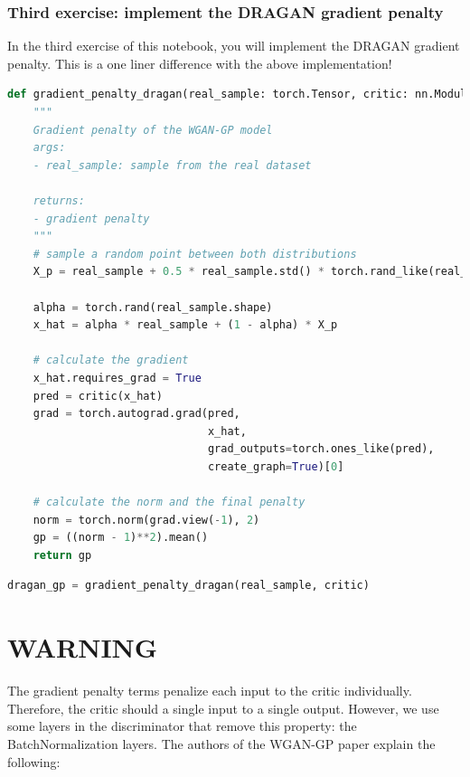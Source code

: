 \subsubsection{Third exercise: implement the DRAGAN gradient penalty}

In the third exercise of this notebook, you will implement the DRAGAN
gradient penalty. This is a one liner difference with the above
implementation!

\begin{lstlisting}[language=Python]
def gradient_penalty_dragan(real_sample: torch.Tensor, critic: nn.Module) -> torch.Tensor:
    """
    Gradient penalty of the WGAN-GP model
    args:
    - real_sample: sample from the real dataset
    
    returns:
    - gradient penalty
    """
    # sample a random point between both distributions
    X_p = real_sample + 0.5 * real_sample.std() * torch.rand_like(real_sample)
    
    alpha = torch.rand(real_sample.shape)
    x_hat = alpha * real_sample + (1 - alpha) * X_p
    
    # calculate the gradient
    x_hat.requires_grad = True
    pred = critic(x_hat)
    grad = torch.autograd.grad(pred, 
                               x_hat, 
                               grad_outputs=torch.ones_like(pred), 
                               create_graph=True)[0]
    
    # calculate the norm and the final penalty
    norm = torch.norm(grad.view(-1), 2)
    gp = ((norm - 1)**2).mean()
    return gp
\end{lstlisting}

\begin{lstlisting}[language=Python]
dragan_gp = gradient_penalty_dragan(real_sample, critic)
\end{lstlisting}

\section{WARNING}

The gradient penalty terms penalize each input to the critic
individually. Therefore, the critic should a single input to a single
output. However, we use some layers in the discriminator that remove
this property: the BatchNormalization layers. The authors of the WGAN-GP
paper explain the following:

